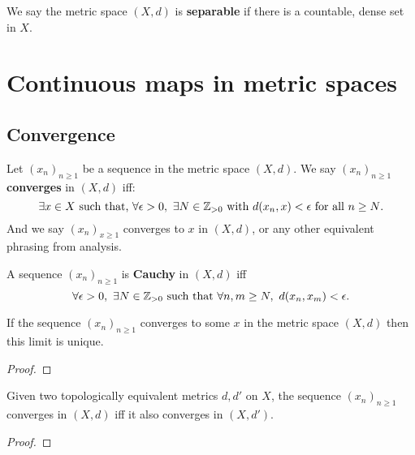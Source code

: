 \documentclass[../Year2.tex]{subfiles}
\begin{document}
\begin{definition}
    We say the metric space $(X,d)$ is \textbf{separable} if there is a countable, dense set in $X$.
\end{definition}

\section{Continuous maps in metric spaces}

\subsection{Convergence}

\begin{definition}
    Let ${(x_n)}_{n\geq1}$ be a sequence in the metric space $(X,d)$. We say ${(x_n)}_{n\geq 1}$ \textbf{converges} in $(X,d)$ iff: \[
        \exists x\in X \ \text{\textcolor{black}{such that, }} \forall\epsilon>0, \ \exists N\in\mathbb{Z}_{>0} \ \text{\textcolor{black}{with }} d(x_n,x)<\epsilon \ \text{\textcolor{black}{for all }} n\geq N\text{\textcolor{black}{.}}
    \] And we say ${(x_n)}_{x\geq 1}$ converges to $x$ in $(X,d)$, or any other equivalent phrasing from analysis.
\end{definition}

\begin{definition}
    A sequence ${(x_n)}_{n\geq 1}$ is \textbf{Cauchy} in $(X,d)$ iff \[
        \forall\epsilon>0, \ \exists N\in\mathbb{Z}_{>0} \ \text{\textcolor{black}{such that }} \forall n,m\geq N,\  d(x_n,x_m)<\epsilon\text{\textcolor{black}{.}}
    \]
    \vspace{-20pt}
\end{definition}

\begin{lemma}
    If the sequence ${(x_n)}_{n\geq 1}$ converges to some $x$ in the metric space $(X,d)$ then this limit is unique.
    \begin{proof}
        
    \end{proof}
\end{lemma}

\begin{theorem}
    Given two topologically equivalent metrics $d,d'$ on $X$, the sequence ${(x_n)}_{n\geq 1}$ converges in $(X,d)$ iff it also converges in $(X,d')$.
    \begin{proof}
        
    \end{proof}
\end{theorem}
\end{document}
